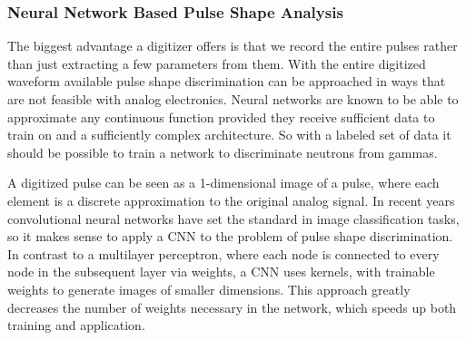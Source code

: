 \documentclass[main.tex]{subfiles}
\begin{document}
\subsubsection{Neural Network Based Pulse Shape Analysis}\label{sec:cnn}
The biggest advantage a digitizer offers is that we record the entire pulses rather than just extracting a few parameters from them. With the entire digitized waveform available pulse shape discrimination can be approached in ways that are not feasible with analog electronics. Neural networks are known to be able to approximate any continuous function provided they receive sufficient data to train on and a sufficiently complex architecture. So with a labeled set of data it should be possible to train a network to discriminate neutrons from gammas. 

A digitized pulse can be seen as a 1-dimensional image of a pulse, where each element is a discrete approximation to the original analog signal. In recent years convolutional neural networks have set the standard in image classification tasks, so it makes sense to apply a CNN to the problem of pulse shape discrimination.  In contrast to a multilayer perceptron, where each node is connected to every node in the subsequent layer via weights, a CNN uses kernels, with trainable weights to generate images of smaller dimensions. This approach greatly decreases the number of weights necessary in the network, which speeds up both training and application\cite[p.330]{Goodfellow-et-al-2016}.
\end{document}
